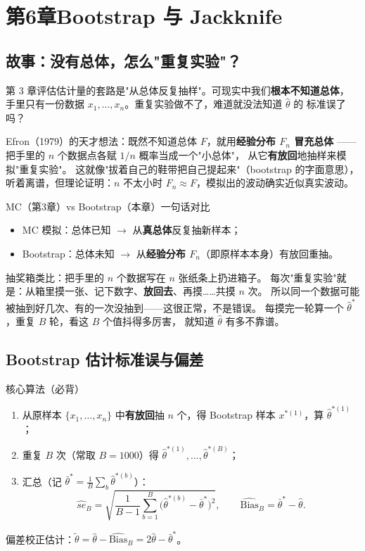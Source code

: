 \section{第6章\quad Bootstrap 与 Jackknife}

\subsection{故事：没有总体，怎么"重复实验"？}

第 3 章评估估计量的套路是"从总体反复抽样"。可现实中我们\textbf{根本不知道总体}，
手里只有一份数据 $x_1,\dots,x_n$。重复实验做不了，难道就没法知道 $\hat\theta$ 的
标准误了吗？

Efron（1979）的天才想法：既然不知道总体 $F$，就用\textbf{经验分布 $F_n$ 冒充总体}
——把手里的 $n$ 个数据点各赋 $1/n$ 概率当成一个"小总体"，
从它\textbf{有放回}地抽样来模拟"重复实验"。
这就像"拔着自己的鞋带把自己提起来"（bootstrap 的字面意思），
听着离谱，但理论证明：$n$ 不太小时 $F_n\approx F$，模拟出的波动确实近似真实波动。

\begin{kbox}{MC（第3章）vs Bootstrap（本章）一句话对比}
\begin{itemize}[leftmargin=2em]
  \item MC 模拟：总体已知 $\to$ 从\textbf{真总体}反复抽新样本；
  \item Bootstrap：总体未知 $\to$ 从\textbf{经验分布 $F_n$}（即原样本本身）有放回重抽。
\end{itemize}
\end{kbox}

\begin{pbox}
抽奖箱类比：把手里的 $n$ 个数据写在 $n$ 张纸条上扔进箱子。
每次"重复实验"就是：从箱里摸一张、记下数字、\textbf{放回去}、再摸……共摸 $n$ 次。
所以同一个数据可能被抽到好几次、有的一次没抽到——这很正常，不是错误。
每摸完一轮算一个 $\hat\theta^*$，重复 $B$ 轮，看这 $B$ 个值抖得多厉害，
就知道 $\hat\theta$ 有多不靠谱。
\end{pbox}

\subsection{Bootstrap 估计标准误与偏差}

\begin{ebox}{核心算法（必背）}
\begin{enumerate}[leftmargin=2em]
  \item 从原样本 $\{x_1,\dots,x_n\}$ 中\textbf{有放回}抽 $n$ 个，得 Bootstrap 样本
  $x^{*(1)}$，算 $\hat\theta^{*(1)}$；
  \item 重复 $B$ 次（常取 $B=1000$）得 $\hat\theta^{*(1)},\dots,\hat\theta^{*(B)}$；
  \item 汇总（记 $\bar\theta^*=\frac1B\sum_b\hat\theta^{*(b)}$）：
  \[
  \widehat{se}_B=\sqrt{\frac{1}{B-1}\sum_{b=1}^B\big(\hat\theta^{*(b)}-\bar\theta^*\big)^2},
  \qquad
  \widehat{\mathrm{Bias}}_B=\bar\theta^*-\hat\theta .
  \]
\end{enumerate}
偏差校正估计：$\tilde\theta=\hat\theta-\widehat{\mathrm{Bias}}_B=2\hat\theta-\bar\theta^*$。
\end{ebox}

